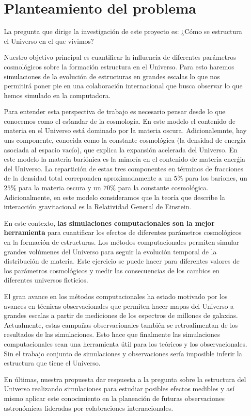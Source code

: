 

\section{Planteamiento del problema}

La pregunta que dirige la investigaci\'on de este proyecto es: ¿Cómo
se estructura el Universo en el que vivimos?

Nuestro objetivo principal es cuantificar la influencia de diferentes
par\'ametros cosmol\'ogicos sobre la formaci\'on estructura en el Universo.
Para esto haremos simulaciones de la evolución de estructuras en
grandes escalas lo que nos permitirá poner pie en una colaboración
internacional que busca observar lo que hemos simulado en la
computadora.

Para entender esta perspectiva de trabajo es necesario pensar desde lo
que conocemos como el es\'tandar de la cosmolog\'ia. 
En este modelo el contenido de materia en el Universo est\'a dominado
por la materia oscura. 
Adicionalemnte, hay uns componente, conocida como la constante cosmol\'ogica (la
densidad de energ\'ia asociada al espacio vac\'io), que explica la
expansi\'on acelerada del Universo. 
En este modelo la materia bari\'onica es la minor\'ia en el contenido
de materia ener\'gia del Universo. 
La repartici\'on de estas tres componentes en t\'erminos de fracciones
de la densidad total correponden aproximadamente a un $5\%$ para los
bariones, un $25\%$ para la materia oscura y un $70\%$ para la
constante cosmol\'ogica. 
Adicionalmente, en este modelo consideramos que la teor\'ia que
describe la interacci\'on gravitacional es la Relatividad General de
Einstein. 

En este contexto, {\bf las simulaciones computacionales son la mejor
herramienta} para cuantificar los efectos de diferentes par\'ametros
cosmol\'ogicos en la formaci\'on de estructuras. 
Los  m\'etodos computacionales permiten simular grandes vol\'umenes
del Universo para seguir la evoluci\'on temporal de la distribuci\'on
de materia. 
Este ejercicio se puede hacer para diferentes valores de los
par\'ametros cosmol\'ogicos y  medir las consecuencias de los cambios
en diferentes universos ficticios.  

El gran avance en los m\'etodos computacionales ha estado motivado por
los avances en t\'ecnicas observacionales que permiten hacer mapas del
Universo a grandes escalas a partir de mediciones de los espectros de
millones de galaxias.   
Actualmente, estas campa\~nas observacionales tambi\'en se
retroalimentan de los resultados de las simulaciones. 
Esto hace que finalmente las simulaciones computacionales sean una
herramienta \'util para los te\'oricos y los observacionales. Sin el
trabajo conjunto de simulaciones y observaciones ser\'ia imposible
inferir la estructura que tiene el Universo.

En \'ultimas, nuestra propuesta dar respuesta a la pregunta sobre la
estructura del Universo realizando simulaciones para estudiar posibles
efectos medibles y as\'i mismo aplicar este conocimiento en la
planeaci\'on de futuras observaciones astron\'omicas lideradas por
colabraciones internacionales. 
